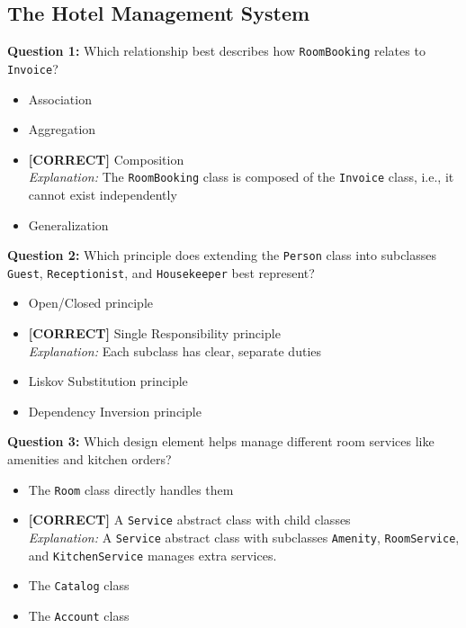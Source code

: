 \subsection*{The Hotel Management System}
\vspace{0.3cm}
\noindent
\textbf{Question 1:} Which relationship best describes how \texttt{RoomBooking} relates to \texttt{Invoice}?
\\[0.2cm]
\begin{itemize}
 \item Association
 \item Aggregation
 \item \textbf{[CORRECT]} Composition
\\[0.1cm]
\textit{Explanation:} 
The \texttt{RoomBooking} class is composed of the \texttt{Invoice} class, i.e., it cannot exist independently
 \item Generalization
\end{itemize}
\vspace{0.3cm}
\noindent
\textbf{Question 2:} Which principle does extending the \texttt{Person} class into subclasses \texttt{Guest}, \texttt{Receptionist}, and \texttt{Housekeeper} best represent?
\\[0.2cm]
\begin{itemize}
 \item Open/Closed principle
 \item \textbf{[CORRECT]} Single Responsibility principle
\\[0.1cm]
\textit{Explanation:} 
Each subclass has clear, separate duties
 \item Liskov Substitution principle
 \item Dependency Inversion principle
\end{itemize}
\vspace{0.3cm}
\noindent
\textbf{Question 3:} Which design element helps manage different room services like amenities and kitchen orders?
\\[0.2cm]
\begin{itemize}
 \item The \texttt{Room} class directly handles them
 \item \textbf{[CORRECT]} A \texttt{Service} abstract class with child classes
\\[0.1cm]
\textit{Explanation:} 
A \texttt{Service} abstract class with subclasses \texttt{Amenity}, \texttt{RoomService}, and \texttt{KitchenService} manages extra services.
 \item The \texttt{Catalog} class
 \item The \texttt{Account} class
\end{itemize}
